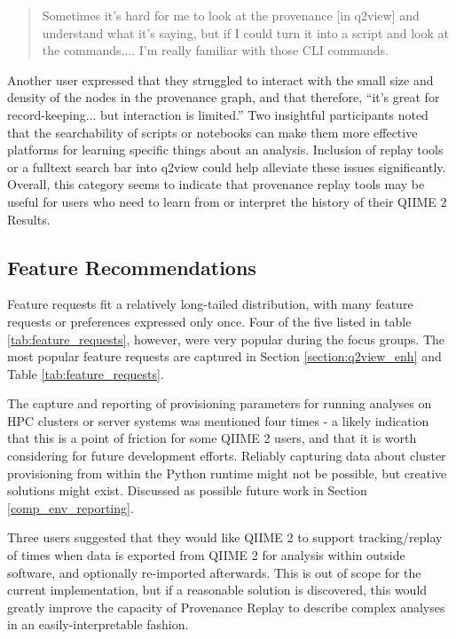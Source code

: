 \begin{quote}
Sometimes it's hard for me to look at the provenance [in q2view] and understand
what it's saying, but if I could turn it into a script and look at the
commands.... I'm really familiar with those CLI commands.
\end{quote}

\noindent Another user expressed that they struggled to interact with the small size and
density of the nodes in the provenance graph, and that therefore, “it's great
for record-keeping... but interaction is limited.” Two insightful participants
noted that the searchability of scripts or notebooks can make them more
effective platforms for learning specific things about an analysis. Inclusion of
replay tools or a fulltext search bar into q2view could help alleviate these
issues significantly. Overall, this category seems to indicate that provenance
replay tools may be useful for users who need to learn from or interpret the
history of their QIIME 2 Results.

\subsection{Feature Recommendations}

Feature requests fit a relatively long-tailed distribution, with many feature
requests or preferences expressed only once. Four of the five listed in table \ref{tab:feature_requests},
however, were very popular during the focus groups. The most popular feature
requests are captured in Section \ref{section:q2view_enh} and Table \ref{tab:feature_requests}.

The capture and reporting of provisioning parameters for running analyses on HPC
clusters or server systems was mentioned four times - a likely indication that
this is a point of friction for some QIIME 2 users, and that it is worth
considering for future development efforts. Reliably capturing data about
cluster provisioning from within the Python runtime might not be possible, but
creative solutions might exist. Discussed as possible future work in Section
\ref{comp_env_reporting}.

Three users suggested that they would like QIIME 2 to support tracking/replay of
times when data is exported from QIIME 2 for analysis within outside software,
and optionally re-imported afterwards. This is out of scope for the current
implementation, but if a reasonable solution is discovered, this would greatly
improve the capacity of Provenance Replay to describe complex analyses in an
easily-interpretable fashion.

